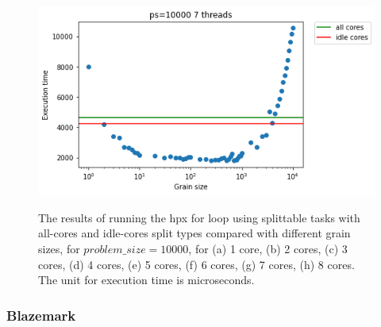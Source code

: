 \begin{figure}[H]
	{\centering\includegraphics[scale=.35]{images/hpx_for_loop/splittable/all_idle_cores/marvin_10000_7.png}	
		\label{fig66:g}}
	\hfill
	\caption{The results of running the hpx for loop using splittable tasks with all-cores and idle-cores split types compared with different grain sizes, for $problem\_size=10000$, for (a) 1 core, (b) 2 cores, (c) 3 cores, (d) 4 cores, (e) 5 cores, (f) 6 cores, (g) 7 cores, (h) 8 cores. The unit for execution time is microseconds.}
	\label{fig66}	
\end{figure}

\subsubsection{Blazemark}